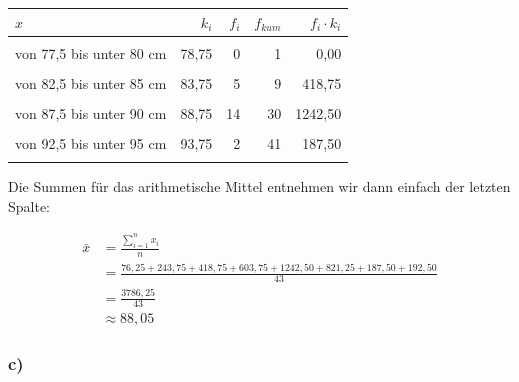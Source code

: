\documentclass[
  11pt,
  ngerman,
  a4paper,
]{report}
\begin{document}
\begin{table}[H]
\centering
\begin{tabular}{>{\raggedright\arraybackslash}p{8cm}rrrr}
\toprule
\textbf{$x$} & \textbf{$k_i$} & \textbf{$f_i$} & \textbf{$f_{kum}$} & \textbf{$f_i \cdot k_i$}\\
\midrule
\cellcolor{gray!6}{von 75 bis unter 77,5 cm} & \cellcolor{gray!6}{76,25} & \cellcolor{gray!6}{1} & \cellcolor{gray!6}{1} & \cellcolor{gray!6}{76,25}\\
von 77,5 bis unter 80 cm & 78,75 & 0 & 1 & 0,00\\
\cellcolor{gray!6}{von 80 bis unter 82,5 cm} & \cellcolor{gray!6}{81,25} & \cellcolor{gray!6}{3} & \cellcolor{gray!6}{4} & \cellcolor{gray!6}{243,75}\\
von 82,5 bis unter 85 cm & 83,75 & 5 & 9 & 418,75\\
\cellcolor{gray!6}{von 85 bis unter 87,5 cm} & \cellcolor{gray!6}{86,25} & \cellcolor{gray!6}{7} & \cellcolor{gray!6}{16} & \cellcolor{gray!6}{603,75}\\
von 87,5 bis unter 90 cm & 88,75 & 14 & 30 & 1242,50\\
\cellcolor{gray!6}{von 90 bis unter 92,5 cm} & \cellcolor{gray!6}{91,25} & \cellcolor{gray!6}{9} & \cellcolor{gray!6}{39} & \cellcolor{gray!6}{821,25}\\
von 92,5 bis unter 95 cm & 93,75 & 2 & 41 & 187,50\\
\cellcolor{gray!6}{von 95 bis unter 97,5 cm} & \cellcolor{gray!6}{96,25} & \cellcolor{gray!6}{2} & \cellcolor{gray!6}{43} & \cellcolor{gray!6}{192,50}\\
\bottomrule
\end{tabular}
\end{table}

Die Summen für das arithmetische Mittel entnehmen wir dann einfach der letzten Spalte:

\[\begin{aligned}
  \bar{x}&=\frac{\sum\limits_{i=1}^nx_i}{n} \\
         &=\frac{76{,}25+ 243{,}75+ 418{,}75+ 603{,}75+1242{,}50+ 821{,}25+ 187{,}50+ 192{,}50}{43} \\
         &=\frac{3786{,}25}{43} \\
         &\approx88{,}05
\end{aligned}\]

\hypertarget{c-5}{%
\subsubsection{c)}\label{c-5}}
\end{document}
